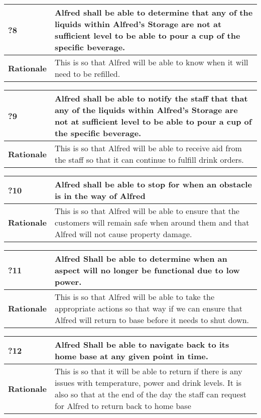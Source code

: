 \documentclass [11pt]{article}
\begin{document}
\begin{longtable}{| p{ } | p{ } | }\hline 
	\rowcolor{tableCell}\textbf{?8} & Alfred shall be able to determine that any of the liquids within Alfred's Storage are not at sufficient level to be able to pour a cup of the specific beverage. \\ \hline
	\textbf{Rationale} &  This is so that Alfred will be able to know when it will need to be refilled.\\ \hline 
\end{longtable}

\begin{longtable}{| p{ } | p{ } | }\hline 
	\rowcolor{tableCell}\textbf{?9} & Alfred shall be able to notify the staff that that any of the liquids within Alfred's Storage are not at sufficient level to be able to pour a cup of the specific beverage. \\ \hline
	\textbf{Rationale} &  This is so that Alfred will be able to receive aid from the staff so that it can continue to fulfill drink orders.\\ \hline 
\end{longtable}

\begin{longtable}{| p{ } | p{ } | }\hline 
	\rowcolor{tableCell}\textbf{?10} & Alfred shall be able to stop for when an obstacle is in the way of Alfred \\ \hline
	\textbf{Rationale} &  This is so that Alfred will be able to ensure that the customers will remain safe when around them and that Alfred will not cause property damage.\\ \hline 
\end{longtable}


\begin{longtable}{| p{ } | p{ } | }\hline 
	\rowcolor{tableCell}\textbf{?11} & Alfred Shall be able to determine when an aspect will no longer be functional due to low power. \\ \hline
	\textbf{Rationale} &  This is so that Alfred will be able to take the appropriate actions so that way if we can ensure that Alfred will return to base before it needs to shut down.\\ \hline 
\end{longtable}

\begin{longtable}{| p{ } | p{ } | }\hline 
	\rowcolor{tableCell}\textbf{?12} & Alfred Shall be able to navigate back to its home base at any given point in time. \\ \hline
	\textbf{Rationale} &  This is so that it will be able to return if there is any issues with temperature, power and drink levels. It is also so that at the end of the day the staff can request for Alfred to return back to home base\\ \hline 
\end{longtable}
\end{document}

